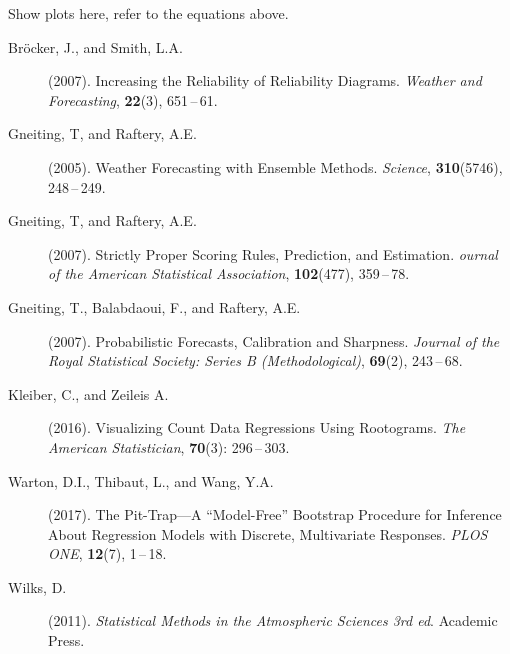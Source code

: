 \documentclass[twoside]{report}
\begin{document}
Show plots here, refer to the equations above.










\begin{description}
\item [Bröcker, J., and Smith, L.A.] (2007).
    Increasing the Reliability of Reliability Diagrams.
    {\it Weather and Forecasting},
    {\bf 22}(3), 651\,--\,61.
\item[Gneiting, T, and Raftery, A.E.] (2005).
    Weather Forecasting with Ensemble Methods.
    {\it Science},
    {\bf 310}(5746), 248\,--\,249.
\item[Gneiting, T, and Raftery, A.E.] (2007).
    Strictly Proper Scoring Rules, Prediction, and Estimation.
    {\it ournal of the American Statistical Association},
    {\bf 102}(477), 359\,--\,78.
\item[Gneiting, T., Balabdaoui, F., and Raftery, A.E.] (2007).
    Probabilistic Forecasts, Calibration and Sharpness.
    {\it Journal of the Royal Statistical Society: Series B (Methodological)},
    {\bf 69}(2), 243\,--\,68.
\item [Kleiber, C., and Zeileis A.] (2016).
    Visualizing Count Data Regressions Using Rootograms.
    {\it The American Statistician},
    {\bf 70}(3): 296\,--\,303.
\item [Warton, D.I., Thibaut, L., and Wang, Y.A.] (2017).
    The Pit-Trap---{A} ``Model-Free'' Bootstrap Procedure for Inference About
    Regression Models with Discrete, Multivariate Responses.
    {\it PLOS ONE},
    {\bf 12}(7), 1\,--\,18.
\item [Wilks, D.] (2011).
    {\it Statistical Methods in the Atmospheric Sciences 3rd ed}.
    Academic Press.
\end{description}
\end{document}

